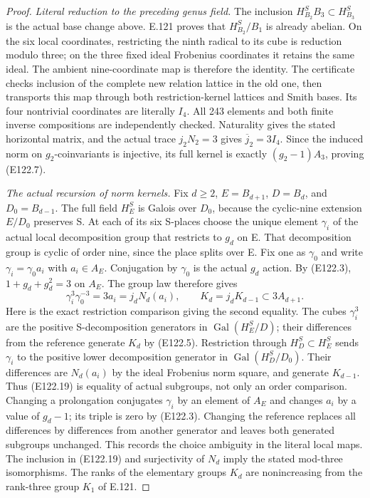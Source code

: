 \begin{proof}
\emph{Literal reduction to the preceding genus field.}
The inclusion $H_{B_2}^S B_3\subset H_{B_3}^S$ is the actual base
change above. E.121 proves that $H_{B_2}^S/B_1$ is already abelian.
On the six local coordinates, restricting the ninth radical to
its cube is reduction modulo three; on the three fixed ideal
Frobenius coordinates it retains the same ideal. The ambient
nine-coordinate map is therefore the identity. The certificate
checks inclusion of the complete new relation lattice in the old
one, then transports this map through both restriction-kernel
lattices and Smith bases. Its four nontrivial coordinates are
literally $I_4$. All 243 elements and both finite inverse compositions
are independently checked. Naturality gives the stated horizontal
matrix, and the actual trace $j_2N_2=3$ gives $\overline j_2=3I_4$.
Since the induced norm on $g_2$-coinvariants is injective, its full
kernel is exactly $(g_2-1)A_3$, proving (E122.7).

\emph{The actual recursion of norm kernels.}
Fix $d\ge2$, $E=B_{d+1}$, $D=B_d$, and $D_0=B_{d-1}$.
The full field $H_E^S$ is Galois over $D_0$, because the cyclic-nine
extension $E/D_0$ preserves S. At each of its six S-places choose
the unique element $\gamma_i$ of the actual local decomposition
group that restricts to $g_d$ on E. That decomposition group is
cyclic of order nine, since the place splits over E. Fix one as
$\gamma_0$ and write $\gamma_i=\gamma_0a_i$ with $a_i\in A_E$.
Conjugation by $\gamma_0$ is the actual $g_d$ action. By (E122.3),
$1+g_d+g_d^2=3$ on $A_E$. The group law therefore gives
\[
 \gamma_i^3\gamma_0^{-3}=3a_i=j_dN_d(a_i),
 \qquad K_d=j_dK_{d-1}\subset3A_{d+1}.
 \tag{E122.19}
\]
Here is the exact restriction comparison giving the second equality.
The cubes $\gamma_i^3$ are the positive S-decomposition generators
in $\operatorname{Gal}(H_E^S/D)$; their differences from the
reference generate $K_d$ by (E122.5). Restriction through
$H_D^S\subset H_E^S$ sends $\gamma_i$ to the positive lower
decomposition generator in $\operatorname{Gal}(H_D^S/D_0)$.
Their differences are $N_d(a_i)$ by the ideal Frobenius norm square,
and generate $K_{d-1}$. Thus (E122.19) is equality of actual
subgroups, not only an order comparison. Changing a prolongation
conjugates $\gamma_i$ by an element of $A_E$ and changes $a_i$
by a value of $g_d-1$; its triple is zero by (E122.3).
Changing the reference replaces all differences by differences
from another generator and leaves both generated subgroups unchanged.
This records the choice ambiguity in the literal local maps.
The inclusion in (E122.19) and surjectivity of $N_d$ imply the
stated mod-three isomorphisms. The ranks of the elementary groups
$K_d$ are nonincreasing from the rank-three group $K_1$ of E.121.


\end{proof}
